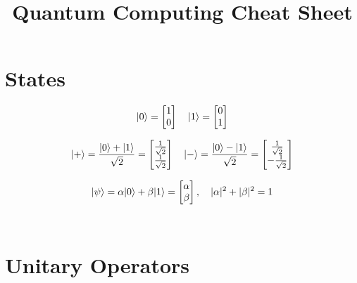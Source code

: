 \documentclass[12pt,a4paper]{article}
\title{Quantum Computing Cheat Sheet}
\date{}
\begin{document}
\maketitle

\section{States}

\begin{equation*}
{\left\vert{0}\right\rangle} = \begin{bmatrix} 1 \\ 0 \end{bmatrix}
\quad
{\left\vert{1}\right\rangle} = \begin{bmatrix} 0 \\ 1 \end{bmatrix}
\end{equation*}

\begin{equation*}
{\left\vert{+}\right\rangle} = \frac{{\left\vert{0}\right\rangle} + {\left\vert{1}\right\rangle}}{\sqrt{2}} 
= \begin{bmatrix} \frac{1}{\sqrt{2}} \\ \frac{1}{\sqrt{2}} \end{bmatrix}
\quad
{\left\vert{-}\right\rangle} = \frac{{\left\vert{0}\right\rangle} - {\left\vert{1}\right\rangle}}{\sqrt{2}}
= \begin{bmatrix} \frac{1}{\sqrt{2}} \\ -\frac{1}{\sqrt{2}} \end{bmatrix}
\end{equation*}

\begin{equation*}
{\left\vert{\psi}\right\rangle} = \alpha {\left\vert{0}\right\rangle} + \beta {\left\vert{1}\right\rangle} = \begin{bmatrix} \alpha \\ \beta \end{bmatrix} ,
\quad
|\alpha|^2 + |\beta|^2 = 1
\end{equation*} \\

\section{Unitary Operators}
\end{document}
